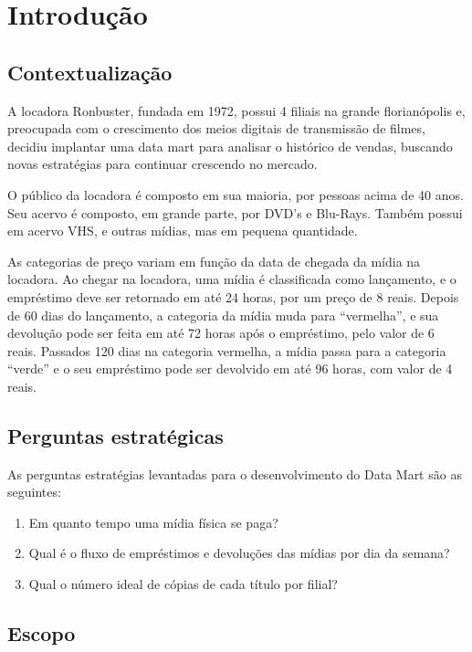 
\chapter{Introdução}

\section{Contextualização}

A locadora Ronbuster, fundada em 1972, 
possui 4 filiais na grande florianópolis e, 
preocupada com o crescimento dos meios digitais 
de transmissão de filmes, decidiu implantar uma 
data mart para analisar o histórico de vendas, 
buscando novas estratégias para continuar 
crescendo no mercado.

O público da locadora é composto em sua maioria, 
por pessoas acima de 40 anos. Seu acervo é 
composto, em grande parte, por DVD’s e Blu-Rays. 
Também possui em acervo VHS, e outras mídias, 
mas em pequena quantidade.

As categorias de preço variam em função da data 
de chegada da mídia na locadora. Ao chegar na 
locadora, uma mídia é classificada como 
lançamento, e o empréstimo deve ser retornado 
em até 24 horas, por um preço de 8 reais. 
Depois de 60 dias do lançamento, a categoria 
da mídia muda para “vermelha”, e sua devolução 
pode ser feita em até 72 horas após o empréstimo, 
pelo valor de 6 reais. Passados 120 dias na 
categoria vermelha, a mídia passa para a 
categoria “verde” e o seu empréstimo pode ser 
devolvido em até 96 horas, com valor de 4 reais.
 
\section{Perguntas estratégicas}

As perguntas estratégias levantadas para o 
desenvolvimento do Data Mart são as seguintes:

\begin{enumerate}
    \item Em quanto tempo uma mídia física se paga?
    \item Qual é o fluxo de empréstimos e devoluções das mídias por dia da semana?    
    \item Qual o número ideal de cópias de cada título por filial?
    \end{enumerate}
  


\section{Escopo}

